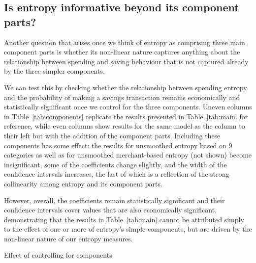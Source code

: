 \subsection{Is entropy informative beyond its component parts?}%
\label{sub:is_entropy_informative_beyond_its_component_parts_}

Another question that arises once we think of entropy as comprising three main
component parts is whether its non-linear nature captures anything about the
relationship between spending and saving behaviour that is not captured already
by the three simpler components. 

We can test this by checking whether the relationship between spending entropy
and the probability of making a savings transaction remains economically and
statistically significant once we control for the three components. Uneven columns in Table~\ref{tab:components} replicate the results presented in Table~\ref{tab:main} for reference, while even columns show results for the same model as the column to their left but with the addition of the component parts. Including these components has some effect: the results for unsmoothed entropy based on 9 categories as well as for unsmoothed merchant-based entropy (not shown) become insignificant, some of the coefficients change slightly, and the width of the confidence intervals increases, the last of which is a reflection of the strong collinearity among entropy and its component parts.

However, overall, the coefficients remain statistically
significant and their confidence intervals cover values that are also
economically significant, demonstrating that the results in Table~\ref{tab:main} cannot be attributed simply to the effect of one or more
of entropy's simple components, but are driven by the non-linear nature of our entropy measures.

\begin{landscape}
\begin{table}[ht]
\centering\scriptsize
\caption{Effect of controlling for components}
\label{tab:components}

\end{table}
\end{landscape}

